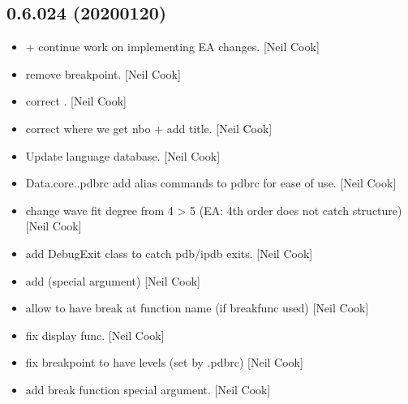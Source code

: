 \documentclass[a4paper,10pt,english]{report}
\begin{document}
\subsection{0.6.024 (2020\sphinxhyphen{}01\sphinxhyphen{}20)}
\label{\detokenize{misc/changelog:id14}}\begin{itemize}
\item {} 
 +  \sphinxhyphen{} continue work
on implementing EA changes. {[}Neil Cook{]}

\item {} 
 \sphinxhyphen{} remove breakpoint. {[}Neil Cook{]}

\item {} 
 \sphinxhyphen{} correct . {[}Neil Cook{]}

\item {} 
 \sphinxhyphen{} correct where we get nbo + add title.
{[}Neil Cook{]}

\item {} 
Update language database. {[}Neil Cook{]}

\item {} 
Data.core..pdbrc \sphinxhyphen{} add alias commands to pdbrc for ease of use. {[}Neil
Cook{]}

\item {} 
 \sphinxhyphen{} change wave fit degree
from 4 \textendash{}\textgreater{} 5 (EA: 4th order does not catch structure) {[}Neil Cook{]}

\item {} 
 \sphinxhyphen{} add DebugExit class to catch pdb/ipdb
exits. {[}Neil Cook{]}

\item {} 
 \sphinxhyphen{} add  (special argument) {[}Neil
Cook{]}

\item {} 
 \sphinxhyphen{} allow  to have break at function
name (if \textendash{}breakfunc used) {[}Neil Cook{]}

\item {} 
 \sphinxhyphen{} fix display func. {[}Neil Cook{]}

\item {} 
 \sphinxhyphen{} fix breakpoint to have levels (set
by .pdbrc) {[}Neil Cook{]}

\item {} 
 \sphinxhyphen{} add break function special argument. {[}Neil
Cook{]}

\end{itemize}
\end{document}
